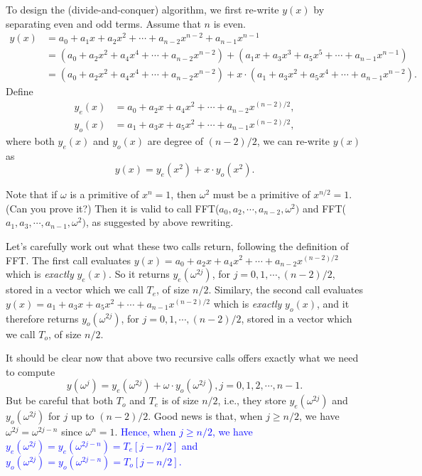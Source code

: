 To design the (divide-and-conquer) algorithm, we first re-write $y(x)$ by separating even and odd terms.
Assume that $n$ is even.
\begin{align*}
y(x) & = a_0 + a_1x + a_2 x^2 + \cdots + a_{n-2} x^{n-2} + a_{n-1} x^{n-1} \\
& = \left(a_0 + a_2 x^2 + a_4x^4 + \cdots + a_{n-2} x^{n-2} \right) + \left(a_1x + a_3 x^3 + a_5 x^5 + \cdots + a_{n-1} x^{n-1} \right) \\
& = \left(a_0 + a_2 x^2 + a_4x^4 + \cdots + a_{n-2} x^{n-2} \right) + x\cdot \left(a_1 + a_3 x^2 + a_5 x^4 + \cdots + a_{n-1} x^{n-2} \right).
\end{align*}
Define
\begin{align*}
y_e(x) &= a_0 + a_2 x + a_4 x^2 + \cdots + a_{n-2} x^{(n-2)/2},  \\
y_o(x) &= a_1 + a_3 x + a_5 x^2 + \cdots + a_{n-1} x^{(n-2)/2},
\end{align*}
where both $y_e(x)$ and $y_o(x)$ are degree of $(n-2)/2$, we can re-write $y(x)$ as
\[ y(x) = y_e(x^2) + x\cdot y_o(x^2). \]

Note that if $\omega$ is a primitive of $x^n = 1$, then $\omega^2$ must be a primitive of $x^{n/2} = 1$. (Can you prove it?)
Then it is valid to call FFT($a_0, a_2, \cdots, a_{n-2}, \omega^2)$ and FFT($a_1, a_3, \cdots, a_{n-1}, \omega^2)$, 
as suggested by above rewriting.

Let's carefully work out what these two calls return, following the definition of FFT.
The first call evaluates $y(x) = a_0 + a_2 x + a_4 x^2 + \cdots + a_{n-2} x^{(n-2)/2}$ which is \emph{exactly} $y_e(x)$.
So it returns $y_e(\omega^{2j})$, for $j=0, 1, \cdots, (n-2)/2$, stored in a vector which we call $T_e$, of size $n/2$.
Similary, the second call evaluates
$y(x) = a_1 + a_3 x + a_5 x^2 + \cdots + a_{n-1} x^{(n-2)/2}$ which is \emph{exactly} $y_o(x)$,
and it therefore returns $y_o(\omega^{2j})$, for $j=0, 1, \cdots, (n-2)/2$, stored in a vector which we call $T_o$, of size $n/2$.

It should be clear now that above two recursive calls offers exactly what we need to compute 
\[  y(\omega^j) = y_e(\omega^{2j}) + \omega \cdot y_o(\omega^{2j}), j = 0, 1, 2, \cdots, n-1. \]
But be careful that both $T_o$ and $T_e$ is of size $n/2$, i.e., they store $y_e(\omega^{2j})$ and
$y_o(\omega^{2j})$ for $j$ up to $(n-2)/2$. Good news is that, when $j \ge n/2$, we
have $\omega^{2j} = \omega^{2j-n}$ since $\omega^n = 1$.
\textcolor{blue}{Hence, when $j\ge n/2$, we have $y_e(\omega^{2j}) = y_e(\omega^{2j-n}) = T_e[j-n/2]$
and $y_o(\omega^{2j}) = y_o(\omega^{2j-n}) = T_o[j-n/2]$.}

